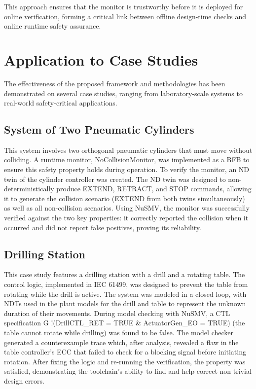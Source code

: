 This approach ensures that the monitor is trustworthy before it is deployed for online verification, forming a critical link between offline design-time checks and online runtime safety assurance.

\section{Application to Case Studies}\label{sec:case_studies}

The effectiveness of the proposed framework and methodologies has been demonstrated on several case studies, ranging from laboratory-scale systems to real-world safety-critical applications.

\subsection{System of Two Pneumatic Cylinders}

This system involves two orthogonal pneumatic cylinders that must move without colliding. A runtime monitor, NoCollisionMonitor, was implemented as a BFB to ensure this safety property holds during operation. To verify the monitor, an ND twin of the cylinder controller was created. The ND twin was designed to non-deterministically produce EXTEND, RETRACT, and STOP commands, allowing it to generate the collision scenario (EXTEND from both twins simultaneously) as well as all non-collision scenarios. Using NuSMV, the monitor was successfully verified against the two key properties: it correctly reported the collision when it occurred and did not report false positives, proving its reliability.

\subsection{Drilling Station}

This case study features a drilling station with a drill and a rotating table. The control logic, implemented in IEC 61499, was designed to prevent the table from rotating while the drill is active. The system was modeled in a closed loop, with NDTs used in the plant models for the drill and table to represent the unknown duration of their movements. During model checking with NuSMV, a CTL specification G !(DrillCTL\_RET = TRUE \& ActuatorGen\_EO = TRUE) (the table cannot rotate while drilling) was found to be false. The model checker generated a counterexample trace which, after analysis, revealed a flaw in the table controller's ECC that failed to check for a blocking signal before initiating rotation. After fixing the logic and re-running the verification, the property was satisfied, demonstrating the toolchain's ability to find and help correct non-trivial design errors.

